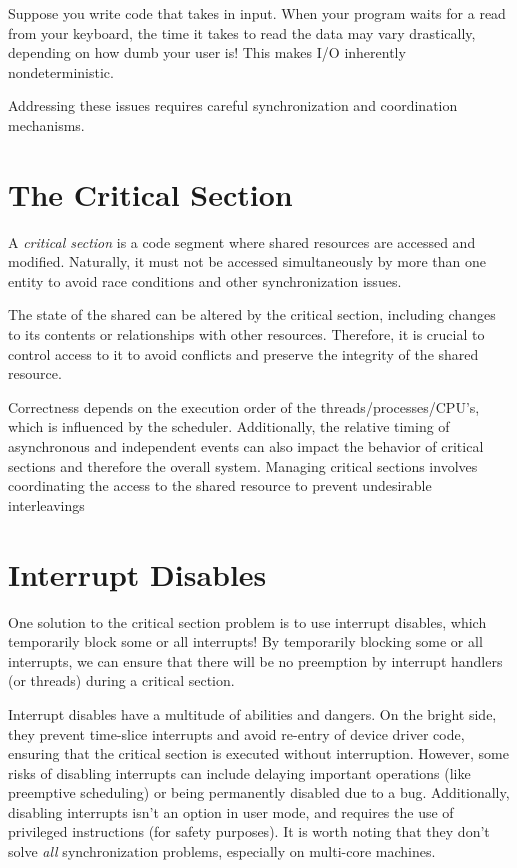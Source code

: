 \documentclass{report}
\newcommand{\definitionBegin}[1]{\begin{tcolorbox}[title={Definition: #1}]}
\newcommand{\definitionEnd}{\end{tcolorbox}}
\newcommand{\exampleBegin}[1]{\begin{tcolorbox}[colback=blue!5!white,colframe=black!75!blue,title={Example:
      #1}]}
\newcommand{\exampleEnd}{\end{tcolorbox}}
\begin{document}
\exampleBegin{I/O}
Suppose you write code that takes in input. When your program waits for a read from your keyboard,
the time it takes to read the data may vary drastically, depending on how dumb your user is! This
makes I/O inherently nondeterministic.
\exampleEnd

Addressing these issues requires careful synchronization and coordination mechanisms.

\section{The Critical Section}
\definitionBegin{Critical Section}
A \textit{critical section} is a code segment where shared resources are accessed and
modified. Naturally, it must not be accessed simultaneously by more than one entity to avoid race
conditions and other synchronization issues.
\definitionEnd

The state of the shared can be altered by the critical section, including changes to its contents or
relationships with other resources. Therefore, it is crucial to control access to it to avoid
conflicts and preserve the integrity of the shared resource.

Correctness depends on the execution order of the threads/processes/CPU's, which is influenced by
the scheduler. Additionally, the relative timing of asynchronous and independent events can also
impact the behavior of critical sections and therefore the overall system. Managing critical
sections involves coordinating the access to the shared resource to prevent undesirable interleavings


\section{Interrupt Disables}
One solution to the critical section problem is to use interrupt disables, which temporarily block
some or all interrupts! By temporarily blocking some or all interrupts, we can ensure that there
will be no preemption by interrupt handlers (or threads) during a critical section.

Interrupt disables have a multitude of abilities and dangers. On the bright side, they prevent
time-slice interrupts and avoid re-entry of device driver code, ensuring that the critical section
is executed without interruption. However, some risks of disabling interrupts can include delaying
important operations (like preemptive scheduling) or being permanently disabled due to a
bug. Additionally, disabling interrupts isn't an option in user mode, and requires the use of
privileged instructions (for safety purposes). It is worth noting that they don't solve \textit{all}
synchronization problems, especially on multi-core machines. 
\end{document}
